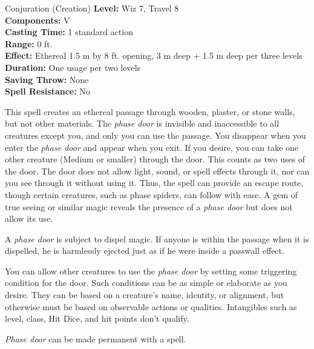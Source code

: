 {Conjuration (Creation)}
{
	\textbf{Level:}
	Wiz 7, Travel 8\\
	\textbf{Components:}
	V\\
	\textbf{Casting Time:}
	1 standard action\\
	\textbf{Range:}
	0 ft.\\
	\textbf{Effect:}
	Ethereal 1.5 m by 8 ft. opening, 3 m deep + 1.5 m deep per three levels\\
	\textbf{Duration:}
	One usage per two levels\\
	\textbf{Saving Throw:}
	None\\
	\textbf{Spell Resistance:}
	No\\
}
{
	This spell creates an ethereal passage through wooden, plaster, or stone walls, but not other materials. The \emph{phase door} is invisible and inaccessible to all creatures except you, and only you can use the passage. You disappear when you enter the \emph{phase door} and appear when you exit. If you desire, you can take one other creature (Medium or smaller) through the door. This counts as two uses of the door. The door does not allow light, sound, or spell effects through it, nor can you see through it without using it. Thus, the spell can provide an escape route, though certain creatures, such as phase spiders, can follow with ease. A gem of true seeing or similar magic reveals the presence of a \emph{phase door} but does not allow its use.

	A \emph{phase door} is subject to dispel magic. If anyone is within the passage when it is dispelled, he is harmlessly ejected just as if he were inside a passwall effect.

	You can allow other creatures to use the \emph{phase door} by setting some triggering condition for the door. Such conditions can be as simple or elaborate as you desire. They can be based on a creature's name, identity, or alignment, but otherwise must be based on observable actions or qualities. Intangibles such as level, class, Hit Dice, and hit points don't qualify.

	\emph{Phase door} can be made permanent with a  spell.

}
